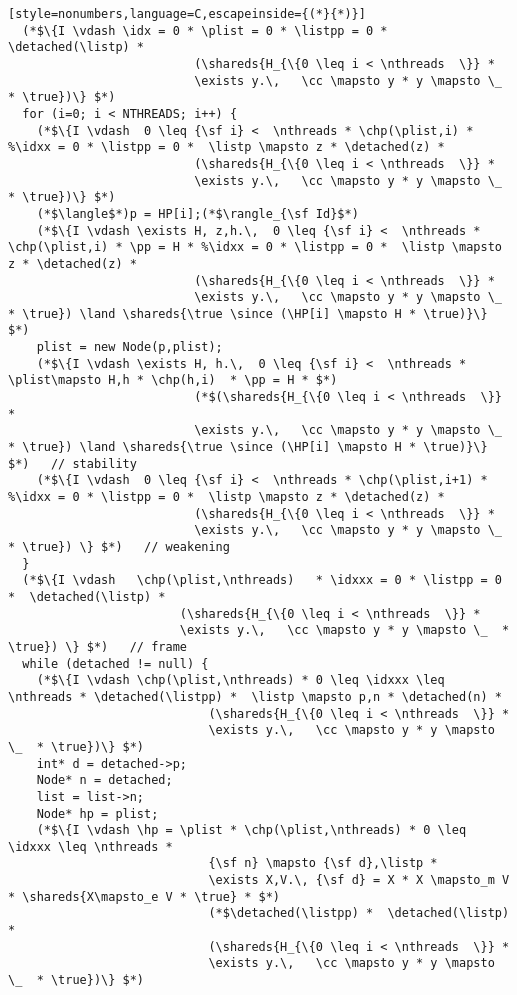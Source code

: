 \begin{figure*}
{\begin{lstlisting}[style=nonumbers,language=C,escapeinside={(*}{*)}]
  (*$\{I \vdash \idx = 0 * \plist = 0 * \listpp = 0 *  \detached(\listp) *
                          (\shareds{H_{\{0 \leq i < \nthreads  \}} * 
                          \exists y.\,   \cc \mapsto y * y \mapsto \_  * \true})\} $*)   
  for (i=0; i < NTHREADS; i++) {
    (*$\{I \vdash  0 \leq {\sf i} <  \nthreads * \chp(\plist,i) * %\idxx = 0 * \listpp = 0 *  \listp \mapsto z * \detached(z) *
                          (\shareds{H_{\{0 \leq i < \nthreads  \}} * 
                          \exists y.\,   \cc \mapsto y * y \mapsto \_  * \true})\} $*)   
    (*$\langle$*)p = HP[i];(*$\rangle_{\sf Id}$*) 
    (*$\{I \vdash \exists H, z,h.\,  0 \leq {\sf i} <  \nthreads * \chp(\plist,i) * \pp = H * %\idxx = 0 * \listpp = 0 *  \listp \mapsto z * \detached(z) *
                          (\shareds{H_{\{0 \leq i < \nthreads  \}} * 
                          \exists y.\,   \cc \mapsto y * y \mapsto \_  * \true}) \land \shareds{\true \since (\HP[i] \mapsto H * \true)}\} $*)       
    plist = new Node(p,plist);                       
    (*$\{I \vdash \exists H, h.\,  0 \leq {\sf i} <  \nthreads * \plist\mapsto H,h * \chp(h,i)  * \pp = H * $*)
                          (*$(\shareds{H_{\{0 \leq i < \nthreads  \}}  *
                          \exists y.\,   \cc \mapsto y * y \mapsto \_  * \true}) \land \shareds{\true \since (\HP[i] \mapsto H * \true)}\} $*)   // stability    
    (*$\{I \vdash  0 \leq {\sf i} <  \nthreads * \chp(\plist,i+1) * %\idxx = 0 * \listpp = 0 *  \listp \mapsto z * \detached(z) *
                          (\shareds{H_{\{0 \leq i < \nthreads  \}} * 
                          \exists y.\,   \cc \mapsto y * y \mapsto \_  * \true}) \} $*)   // weakening    
  }
  (*$\{I \vdash   \chp(\plist,\nthreads)   * \idxxx = 0 * \listpp = 0 *  \detached(\listp) *
                        (\shareds{H_{\{0 \leq i < \nthreads  \}} * 
                        \exists y.\,   \cc \mapsto y * y \mapsto \_  * \true}) \} $*)   // frame    
  while (detached != null) {
    (*$\{I \vdash \chp(\plist,\nthreads) * 0 \leq \idxxx \leq \nthreads * \detached(\listpp) *  \listp \mapsto p,n * \detached(n) *
                            (\shareds{H_{\{0 \leq i < \nthreads  \}} * 
                            \exists y.\,   \cc \mapsto y * y \mapsto \_  * \true})\} $*)   
    int* d = detached->p;
    Node* n = detached;
    list = list->n;
    Node* hp = plist;
    (*$\{I \vdash \hp = \plist * \chp(\plist,\nthreads) * 0 \leq \idxxx \leq \nthreads *  
                            {\sf n} \mapsto {\sf d},\listp *
                            \exists X,V.\, {\sf d} = X * X \mapsto_m V * \shareds{X\mapsto_e V * \true} * $*)
                            (*$\detached(\listpp) *  \detached(\listp) * 
                            (\shareds{H_{\{0 \leq i < \nthreads  \}} * 
                            \exists y.\,   \cc \mapsto y * y \mapsto \_  * \true})\} $*)   


\end{lstlisting}}
\end{figure*}
